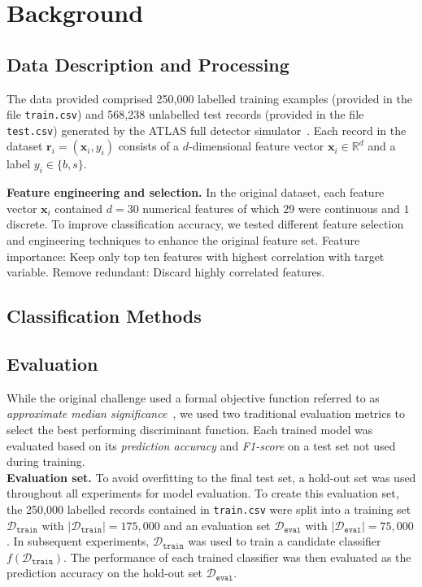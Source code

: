 \documentclass[10pt,conference,compsocconf]{IEEEtran}
\newcommand{\parabf}[1]{\vspace{1mm}\noindent\textbf{#1}}
\newcommand{\classifier}[1]{f({#1})}
\newcommand{\Deval}{\mathcal{D}_{\mathtt{eval}}}
\newcommand{\Dtrain}{\mathcal{D}_{\mathtt{train}}}
\newcommand{\features}{\mathbf{x}_i}
\newcommand{\target}{y_i}
\begin{document}
\section{Background}

\subsection{Data Description and Processing}
\label{sec:data}
The data provided comprised 250,000 labelled training examples (provided in the file \texttt{train.csv}) and 568,238 unlabelled test records (provided in the file \texttt{test.csv}) generated by the ATLAS full detector simulator~\cite{HiggsML}.
Each record in the dataset $\mathbf{r}_i = (\features, \target)$ consists of a $d$-dimensional feature vector $\features \in \mathbb{R}^d$ and a label $\target \in \{ b, s \}$.     


\parabf{Feature engineering and selection.} In the original dataset, each feature vector $\features$ contained $d=30$ numerical features of which $29$ were continuous and $1$ discrete.
To improve classification accuracy, we tested different feature selection and engineering techniques to enhance the original feature set.
Feature importance: Keep only top ten features with highest correlation with target variable. Remove redundant: Discard highly correlated features.

\subsection{Classification Methods}

\subsection{Evaluation}
While the original challenge used a formal objective function referred to as \emph{approximate median significance}~\cite{HiggsML}, we used two traditional evaluation metrics to select the best performing discriminant function. Each trained model was evaluated based on its \emph{prediction accuracy} and \emph{F1-score} on a test set not used during training.\\

\parabf{Evaluation set.} To avoid overfitting to the final test set, a hold-out set was used throughout all experiments for model evaluation. To create this evaluation set, the 250,000 labelled records contained in \texttt{train.csv} were split into a training set $\Dtrain$ with $|\Dtrain| = 175,000$ and an evaluation set $\Deval$ with $|\Deval| = 75,000$. In subsequent experiments, $\Dtrain$ was used to train a candidate classifier $\classifier{\Dtrain}$. The performance of each trained classifier was then evaluated as the prediction accuracy on the hold-out set $\Deval$.\\
\end{document}
